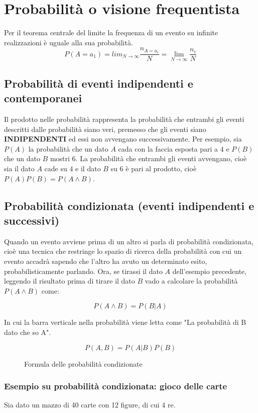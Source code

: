 \documentclass[\main/main.tex]{subfiles}
\begin{document}
\section{Probabilità o visione frequentista}
Per il teorema centrale del limite la frequenza di un evento su infinite realizzazioni è uguale alla sua probabilità.
\[
  P(A=a_1) = lim_{N\rightarrow \infty} \dfrac{n_{A=a_i}}{N} = \lim_{N\rightarrow \infty} \dfrac{n_i}{N}
\]

\subsection{Probabilità di eventi indipendenti e contemporanei}
Il prodotto nelle probabilità rappresenta la probabilità che entrambi gli eventi descritti dalle probabilità siano veri, premesso che gli eventi siano \textbf{INDIPENDENTI} ed essi non avvengano successivamente.
Per esempio, sia $P(A)$ la probabilità che un dato $A$ cada con la faccia esposta pari a $4$ e $P(B)$ che un dato $B$ mostri $6$. La probabilità che entrambi gli eventi avvengano, cioè sia il dato $A$ cade su $4$ e il dato $B$ su $6$ è pari al prodotto, cioè $P(A)P(B) = P(A \wedge B)$.

\subsection{Probabilità condizionata (eventi indipendenti e successivi)}
Quando un evento avviene prima di un altro si parla di probabilità condizionata, cioè una tecnica che restringe lo spazio di ricerca della probabilità con cui un evento accadrà sapendo che l'altro ha avuto un determinato esito, probabilisticamente parlando. Ora, se tirassi il dato $A$ dell'esempio precedente, leggendo il risultato prima di tirare il dato $B$ vado a calcolare la probabilità $P(A \wedge B)$ come:

\[
  P(A \wedge B) = P(B | A)
\]

In cui la barra verticale nella probabilità viene letta come "La probabilità di B dato che so A".

\begin{figure}[H]
  \[
    P(A, B) = P(A|B) P(B)
  \]
  \caption{Formula delle probabilità condizionate}
\end{figure}

\subsubsection{Esempio su probabilità condizionata: gioco delle carte}
Sia dato un mazzo di 40 carte con 12 figure, di cui 4 re.
\end{document}
